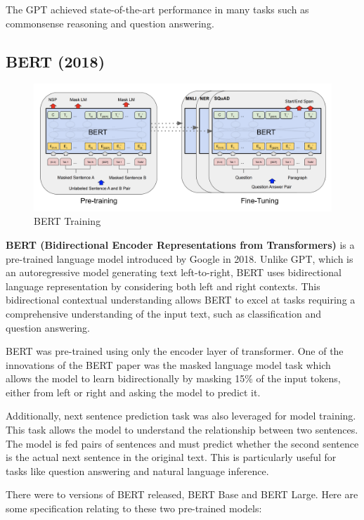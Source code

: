 The GPT achieved state-of-the-art performance in many tasks such as commonsense reasoning and question answering.


\subsection{BERT (2018)}

\begin{figure}[H]
    \centering
    \includegraphics[width=0.9\linewidth]{fig/BERt.png}
    \caption{BERT Training}
    \label{fig:enter-label}
\end{figure}

\textbf{BERT (Bidirectional Encoder Representations from Transformers)} is a pre-trained language model introduced by Google in 2018. Unlike GPT, which is an autoregressive model generating text left-to-right, BERT uses bidirectional language representation by considering both left and right contexts. This bidirectional contextual understanding allows BERT to excel at tasks requiring a comprehensive understanding of the input text, such as classification and question answering.

BERT was pre-trained using only the encoder layer of transformer. One of the innovations of the BERT paper was the masked language model task which allows the model to learn bidirectionally by masking 15\% of the input tokens, either from left or right and asking the model to predict it.

Additionally, next sentence prediction task was also leveraged for model training. This task allows the model to understand the relationship between two sentences. The model is fed pairs of sentences and must predict whether the second sentence is the actual next sentence in the original text. This is particularly useful for tasks like question answering and natural language inference.


There were to versions of BERT released, BERT Base and BERT Large. Here are some specification relating to these two pre-trained models: \\

